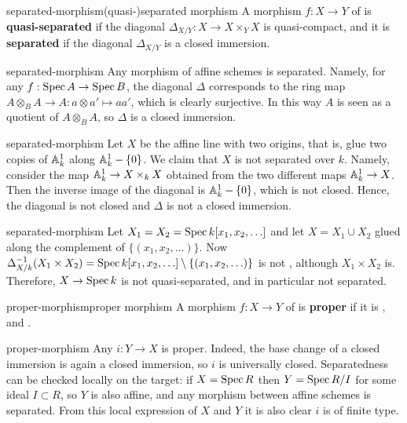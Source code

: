 \begin{topic}{separated-morphism}{(quasi-)separated morphism}
    A morphism $f : X \to Y$ of  is \textbf{quasi-separated} if the diagonal $\Delta_{X/Y} : X \to X \times_Y X$ is quasi-compact, and it is \textbf{separated} if the diagonal $\Delta_{X/Y}$ is a closed immersion.
\end{topic}

\begin{example}{separated-morphism}
    Any morphism of affine schemes is separated. Namely, for any $f : \Spec A \to \Spec B$, the diagonal $\Delta$ corresponds to the ring map $A \otimes_B A \to A : a \otimes a' \mapsto aa'$, which is clearly surjective. In this way $A$ is seen as a quotient of $A \otimes_B A$, so $\Delta$ is a closed immersion.
\end{example}

\begin{example}{separated-morphism}
    Let $X$ be the affine line with two origins, that is, glue two copies of $\AA_k^1$ along $\AA_k^1 - \{ 0 \}$. We claim that $X$ is not separated over $k$. Namely, consider the map $\AA^1_k \to X \times_k X$ obtained from the two different maps $\AA_k^1 \to X$. Then the inverse image of the diagonal is $\AA_k^1 - \{ 0 \}$, which is not closed. Hence, the diagonal is not closed and $\Delta$ is not a closed immersion.
\end{example}

\begin{example}{separated-morphism}
    Let $X_1 = X_2 = \Spec k[x_1, x_2, \ldots]$ and let $X = X_1 \cup X_2$ glued along the complement of $\{ (x_1, x_2, \ldots) \}$. Now $\Delta_{X/k}^{-1}(X_1 \times X_2) = \Spec k[x_1, x_2, \ldots] \setminus \{ (x_1, x_2, \ldots) \}$ is not , although $X_1 \times X_2$ is. Therefore, $X \to \Spec k$ is not quasi-separated, and in particular not separated.
\end{example}

\begin{topic}{proper-morphism}{proper morphism}
    A morphism $f : X \to Y$ of  is \textbf{proper} if it is ,  and .
\end{topic}

\begin{example}{proper-morphism}
    Any  $i : Y \to X$ is proper. Indeed, the base change of a closed immersion is again a closed immersion, so $i$ is universally closed. Separatedness can be checked locally on the target: if $X = \Spec R$ then $Y = \Spec R / I$ for some ideal $I \subset R$, so $Y$ is also affine, and any morphism between affine schemes is separated. From this local expression of $X$ and $Y$ it is also clear $i$ is of finite type.
\end{example}

